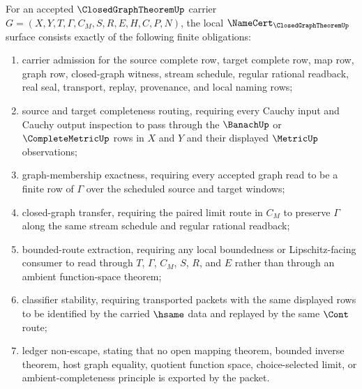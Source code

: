 \begin{theorem}
\label{thm:closed-graph-theorem-namecert-obligations}
For an accepted $\ClosedGraphTheoremUp$ carrier $G=(X,Y,T,\Gamma,C_M,S,R,E,H,C,P,N)$, the local $\NameCert_{\ClosedGraphTheoremUp}$ surface consists exactly of the following finite obligations:
\begin{enumerate}
\item carrier admission for the source complete row, target complete row, map row, graph row, closed-graph witness, stream schedule, regular rational readback, real seal, transport, replay, provenance, and local naming rows;
\item source and target completeness routing, requiring every Cauchy input and Cauchy output inspection to pass through the $\BanachUp$ or $\CompleteMetricUp$ rows in $X$ and $Y$ and their displayed $\MetricUp$ observations;
\item graph-membership exactness, requiring every accepted graph read to be a finite row of $\Gamma$ over the scheduled source and target windows;
\item closed-graph transfer, requiring the paired limit route in $C_M$ to preserve $\Gamma$ along the same stream schedule and regular rational readback;
\item bounded-route extraction, requiring any local boundedness or Lipschitz-facing consumer to read through $T$, $\Gamma$, $C_M$, $S$, $R$, and $E$ rather than through an ambient function-space theorem;
\item classifier stability, requiring transported packets with the same displayed rows to be identified by the carried $\hsame$ data and replayed by the same $\Cont$ route;
\item ledger non-escape, stating that no open mapping theorem, bounded inverse theorem, host graph equality, quotient function space, choice-selected limit, or ambient-completeness principle is exported by the packet.
\end{enumerate}
\end{theorem}
